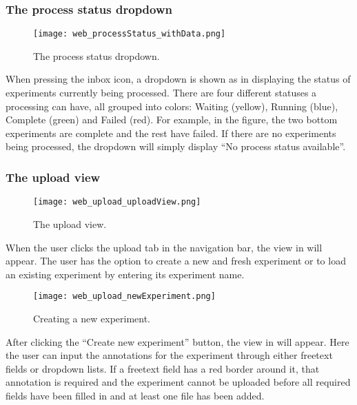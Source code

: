 \subsubsection{The process status dropdown}
\begin{figure}[h]
\centering
\texttt{[image: web\_processStatus\_withData.png]}
\caption{\label{fig:web_processStatus_withData}The process status dropdown.}
\end{figure}
\FloatBarrier
When pressing the inbox icon, a dropdown is shown as in  displaying the status of experiments currently being processed. There are four different statuses a processing can have, all grouped into colors: Waiting (yellow), Running (blue), Complete (green) and Failed (red). For example, in the figure, the two bottom experiments are complete and the rest have failed. If there are no experiments being processed, the dropdown will simply display “No process status available”.


\subsubsection{The upload view}

\begin{figure}[h]
\centering
\texttt{[image: web\_upload\_uploadView.png]}
\caption{\label{fig:web_upload_uploadView}The upload view.}
\end{figure}

When the user clicks the upload tab in the navigation bar, the view in  will appear. The user has the option to create a new and fresh experiment or to load an existing experiment by entering its experiment name. 

\begin{figure}[h]
\centering
\texttt{[image: web\_upload\_newExperiment.png]}
\caption{\label{fig:web_upload_newExperiment}Creating a new experiment.}
\end{figure}

After clicking the “Create new experiment” button, the view in  will appear. Here the user can input the annotations for the experiment through either freetext fields or dropdown lists. If a freetext field has a red border around it, that annotation is required and the experiment cannot be uploaded before all required fields have been filled in and at least one file has been added.


